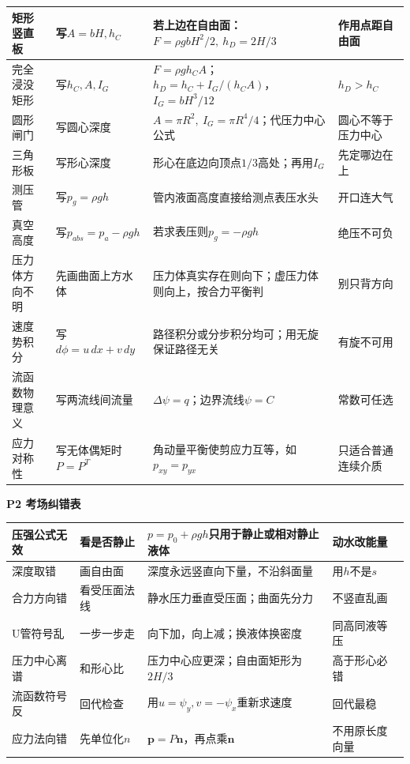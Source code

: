 \documentclass[UTF8,a4paper]{ctexart}
\newcommand{\ftitle}[1]{\vspace{1pt}\textbf{\textcolor{B}{#1}}\par\vspace{0.5pt}}
\begin{document}
\begin{tabular}{|L{0.19\textwidth}|L{0.23\textwidth}|L{0.34\textwidth}|L{0.19\textwidth}|}\hline
矩形竖直板 & 写$A=bH,h_C$ & 若上边在自由面：$F=\rho gbH^2/2,\ h_D=2H/3$ & 作用点距自由面 \\\hline
完全浸没矩形 & 写$h_C,A,I_G$ & $F=\rho gh_CA$；$h_D=h_C+I_G/(h_CA)$，$I_G=bH^3/12$ & $h_D>h_C$ \\\hline
圆形闸门 & 写圆心深度 & $A=\pi R^2,\ I_G=\pi R^4/4$；代压力中心公式 & 圆心不等于压力中心 \\\hline
三角形板 & 写形心深度 & 形心在底边向顶点$1/3$高处；再用$I_G$ & 先定哪边在上 \\\hline
测压管 & 写$p_g=\rho gh$ & 管内液面高度直接给测点表压水头 & 开口连大气 \\\hline
真空高度 & 写$p_{abs}=p_a-\rho gh$ & 若求表压则$p_g=-\rho gh$ & 绝压不可负 \\\hline
压力体方向不明 & 先画曲面上方水体 & 压力体真实存在则向下；虚压力体则向上，按合力平衡判 & 别只背方向 \\\hline
速度势积分 & 写$d\phi=u\,dx+v\,dy$ & 路径积分或分步积分均可；用无旋保证路径无关 & 有旋不可用 \\\hline
流函数物理意义 & 写两流线间流量 & $\Delta\psi=q$；边界流线$\psi=C$ & 常数可任选 \\\hline
应力对称性 & 写无体偶矩时$P=P^T$ & 角动量平衡使剪应力互等，如$p_{xy}=p_{yx}$ & 只适合普通连续介质 \\\hline
\end{tabular}
\ftitle{P2 考场纠错表}
\begin{tabular}{|L{0.22\textwidth}|L{0.25\textwidth}|L{0.33\textwidth}|L{0.15\textwidth}|}\hline
压强公式无效 & 看是否静止 & $p=p_0+\rho gh$只用于静止或相对静止液体 & 动水改能量 \\\hline
深度取错 & 画自由面 & 深度永远竖直向下量，不沿斜面量 & 用$h$不是$s$ \\\hline
合力方向错 & 看受压面法线 & 静水压力垂直受压面；曲面先分力 & 不竖直乱画 \\\hline
U管符号乱 & 一步一步走 & 向下加，向上减；换液体换密度 & 同高同液等压 \\\hline
压力中心离谱 & 和形心比 & 压力中心应更深；自由面矩形为$2H/3$ & 高于形心必错 \\\hline
流函数符号反 & 回代检查 & 用$u=\psi_y,v=-\psi_x$重新求速度 & 回代最稳 \\\hline
应力法向错 & 先单位化$n$ & $\bm p=P\bm n$，再点乘$\bm n$ & 不用原长度向量 \\\hline
\end{tabular}
\newpage
\end{document}

